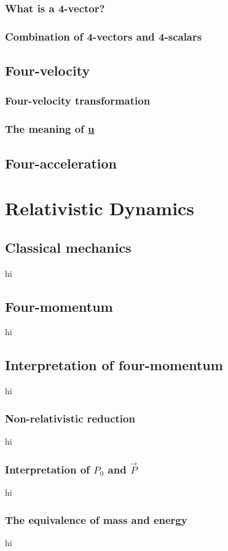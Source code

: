 \documentclass[a4paper,11pt]{article}
\numberwithin{equation}{section}
\begin{document}
 \subsubsection{What is a 4-vector?}
 \subsubsection{Combination of 4-vectors and 4-scalars}
 
 \subsection{Four-velocity}
 \subsubsection{Four-velocity transformation}
 \subsubsection{The meaning of \underline{u}}
 
 \subsection{Four-acceleration}
  \newpage
 \section{Relativistic Dynamics}
 \subsection{Classical mechanics}
 hi
 \subsection{Four-momentum}
 hi
 \subsection{Interpretation of four-momentum}
  hi
  \subsubsection{Non-relativistic reduction}
  hi
  \subsubsection{Interpretation of $P_{0}$ and $\vec{P}$}
  hi
  \subsubsection{The equivalence of mass and energy}
  hi
\end{document}
